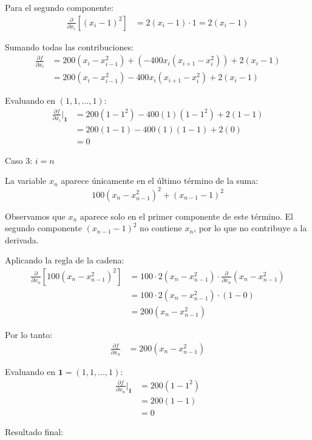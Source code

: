 \documentclass{article}
\begin{document}
Para el segundo componente:
\begin{align}
\frac{\partial}{\partial x_i}\left[(x_i - 1)^2\right] &= 2(x_i - 1) \cdot 1 = 2(x_i - 1)
\end{align}

Sumando todas las contribuciones:
\begin{align}
\frac{\partial f}{\partial x_i} &= 200(x_i - x_{i-1}^2) + \left(-400x_i(x_{i+1} - x_i^2)\right) + 2(x_i - 1) \\
&= 200(x_i - x_{i-1}^2) - 400x_i(x_{i+1} - x_i^2) + 2(x_i - 1)
\end{align}

Evaluando en $(1, 1, \ldots, 1)$:
\begin{align}
\frac{\partial f}{\partial x_i}\bigg|_{\mathbf{1}} &= 200(1 - 1^2) - 400(1)(1 - 1^2) + 2(1 - 1) \\
&= 200(1 - 1) - 400(1)(1 - 1) + 2(0) \\
&= 0
\end{align}

Caso 3: $i = n$ 

La variable $x_n$ aparece únicamente en el último término de la suma:
$$100(x_n - x_{n-1}^2)^2 + (x_{n-1} - 1)^2$$

Observamos que $x_n$ aparece solo en el primer componente de este término. El segundo componente $(x_{n-1} - 1)^2$ no contiene $x_n$, por lo que no contribuye a la derivada.

Aplicando la regla de la cadena:
\begin{align}
\frac{\partial}{\partial x_n}\left[100(x_n - x_{n-1}^2)^2\right] &= 100 \cdot 2(x_n - x_{n-1}^2) \cdot \frac{\partial}{\partial x_n}(x_n - x_{n-1}^2) \\
&= 100 \cdot 2(x_n - x_{n-1}^2) \cdot (1 - 0) \\
&= 200(x_n - x_{n-1}^2)
\end{align}

Por lo tanto:
\begin{align}
\frac{\partial f}{\partial x_n} &= 200(x_n - x_{n-1}^2)
\end{align}

Evaluando en $\mathbf{1} = (1, 1, \ldots, 1)$:
\begin{align}
\frac{\partial f}{\partial x_n}\bigg|_{\mathbf{1}} &= 200(1 - 1^2) \\
&= 200(1 - 1) \\
&= 0
\end{align}

Resultado final:
\end{document}
